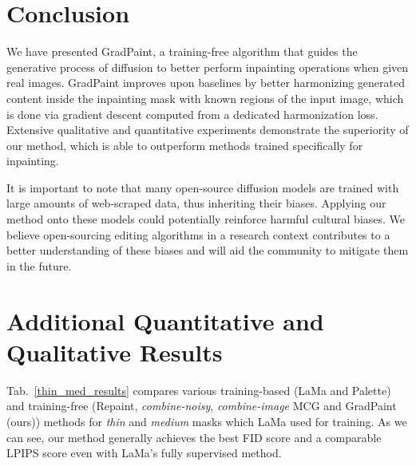 










%

\section{Conclusion}

We have presented GradPaint, a training-free algorithm that guides the generative process of diffusion to better perform inpainting operations when given real images. GradPaint improves upon baselines by better harmonizing generated content inside the inpainting mask with known regions of the input image, which is done via gradient descent computed from a dedicated harmonization loss. Extensive qualitative and quantitative experiments demonstrate the superiority of our method, which is able to outperform methods trained specifically for inpainting.

It is important to note that many open-source diffusion models are trained with large amounts of web-scraped data, thus inheriting their biases. Applying our method onto these models could potentially reinforce harmful cultural biases. We believe open-sourcing editing algorithms in a research context contributes to a better understanding of these biases and will aid the community to mitigate them in the future.


%




\section{Additional Quantitative and Qualitative Results}


Tab.~\ref{thin_med_results} compares various training-based (LaMa and Palette) and training-free (Repaint, \emph{combine-noisy}, \emph{combine-image} MCG and GradPaint (ours)) methods for \emph{thin} and \emph{medium} masks which LaMa used for training. As we can see, our method generally achieves the best FID score and a comparable LPIPS score even with LaMa's fully supervised method.  

